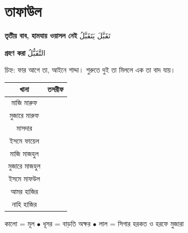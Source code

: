 \newpage

\section{তাফাউল}

\begin{center}
  \textbf{তৃতীয় বাব, হামযায় ওয়াসল নেই}
  \enspace
  {\arabicfont \textarabic{تَقَبَّلَ يَتَقَبَّلُ}}
\end{center}

\vspace{0.2cm}

\begin{center}
  \textbf{গ্রহণ করা}
  \enspace
  {\arabicfont \textarabic{التَّقَبُّلُ}}
\end{center}

\vspace{0.25cm}

\noindent চিহ্ন: ফার আগে তা, আইনে শাদ্দা।
শুরুতে দুই তা মিললে এক তা বাদ যায়।

\vspace{0.3cm}

\begingroup
\setlength{\arrayrulewidth}{0.5pt}
\setlength{\tabcolsep}{4pt}
\renewcommand{\arraystretch}{1.85}

\noindent\begin{tabularx}{\textwidth}{|C|C|}
  \hline
  {\color{white}\textbf{খানা}} &
  {\color{white}\textbf{তসরীফ}} \\
  \hline
  মাজি মারুফ &
  {\arabicfont {}} \\
  \hline
  মুজারে মারুফ &
  {\arabicfont {}} \\
  \hline
  মাসদার &
  {\arabicfont \textarabic{}} \\
  \hline
  ইসমে ফায়েল &
  {\arabicfont \textarabic{}} \\
  \hline
  মাজি মাজহুল &
  {\arabicfont {}} \\
  \hline
  মুজারে মাজহুল &
  {\arabicfont {}} \\
  \hline
  ইসমে মাফউল &
  {\arabicfont \textarabic{}} \\
  \hline
  আমর হাজির &
  {\arabicfont {}} \\
  \hline
  নাহি হাজির &
  {\arabicfont {}} \\
  \hline
\end{tabularx}
\endgroup

\vspace{0.25cm}

\begin{center}
  {\small
    কালো = মূল
    \enspace$\bullet$\enspace
    ধূসর = বাড়তি অক্ষর
    \enspace$\bullet$\enspace
    লাল = সিগার হরকত ও হরফে মুজারা
  }
\end{center}

